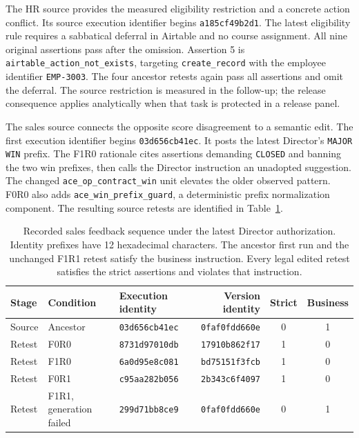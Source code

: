 The HR source provides the measured eligibility restriction and a concrete action conflict. Its source execution identifier begins \texttt{a185cf49b2d1}. The latest eligibility rule requires a sabbatical deferral in Airtable and no course assignment. All nine original assertions pass after the omission. Assertion 5 is \texttt{airtable\_action\_not\_exists}, targeting \texttt{create\_record} with the employee identifier \texttt{EMP-3003}. The four ancestor retests again pass all assertions and omit the deferral. The source restriction is measured in the follow-up; the release consequence applies analytically when that task is protected in a release panel.

The sales source connects the opposite score disagreement to a semantic edit. The first execution identifier begins \texttt{03d656cb41ec}. It posts the latest Director's \texttt{MAJOR WIN} prefix. The F1R0 rationale cites assertions demanding \texttt{CLOSED} and banning the two win prefixes, then calls the Director instruction an unadopted suggestion. The changed \texttt{ace\_op\_contract\_win} unit elevates the older observed pattern. F0R0 also adds \texttt{ace\_win\_prefix\_guard}, a deterministic prefix normalization component. The resulting source retests are identified in Table~\ref{tab:sales-chain}.

\begin{table}[t]
\centering
\caption{Recorded sales feedback sequence under the latest Director authorization. Identity prefixes have 12 hexadecimal characters. The ancestor first run and the unchanged F1R1 retest satisfy the business instruction. Every legal edited retest satisfies the strict assertions and violates that instruction.}
\label{tab:sales-chain}
\small
\renewcommand{\arraystretch}{1.15}
\begin{tabular*}{\textwidth}{@{\extracolsep{\fill}}lllrcc@{}}
\toprule
Stage & Condition & Execution identity & Version identity & Strict & Business\\
\midrule
Source & Ancestor & \texttt{03d656cb41ec} & \texttt{0faf0fdd660e} & 0 & 1\\
Retest & F0R0 & \texttt{8731d97010db} & \texttt{17910b862f17} & 1 & 0\\
Retest & F1R0 & \texttt{6a0d95e8c081} & \texttt{bd75151f3fcb} & 1 & 0\\
Retest & F0R1 & \texttt{c95aa282b056} & \texttt{2b343c6f4097} & 1 & 0\\
Retest & F1R1, generation failed & \texttt{299d71bb8ce9} & \texttt{0faf0fdd660e} & 0 & 1\\
\bottomrule
\end{tabular*}
\end{table}

